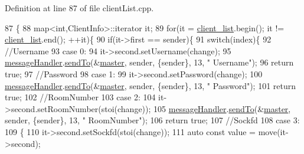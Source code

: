 Definition at line 87 of file client\+List.\+cpp.


\begin{DoxyCode}
87                                                                  \{
88     map<int,ClientInfo>::iterator it;
89     \textcolor{keywordflow}{for}(it = \hyperlink{class_client_list_a53c73362bff032aa6fceab4b8b5b39de}{client\_list}.begin(); it != \hyperlink{class_client_list_a53c73362bff032aa6fceab4b8b5b39de}{client\_list}.end(); ++it)\{
90         \textcolor{keywordflow}{if}(it->first == sender)\{
91             \textcolor{keywordflow}{switch}(index)\{
92                 \textcolor{comment}{//Username}
93                 \textcolor{keywordflow}{case} 0:
94                     it->second.setUsername(change);
95                     \hyperlink{class_client_list_a15fd10297f79e0d1278d3b106c715390}{messageHandler}.\hyperlink{class_message_handler_a81dd916f61ef7f19d10cd3adee55bda9}{sendTo}(&\hyperlink{class_client_list_a819f5455b1afa484d846d5b6ef4209a7}{master}, sender, \{sender\}, 13, \textcolor{stringliteral}{"
      Username"});
96                     \textcolor{keywordflow}{return} \textcolor{keyword}{true};
97                 \textcolor{comment}{//Password}
98                 \textcolor{keywordflow}{case} 1:
99                     it->second.setPassword(change);
100                     \hyperlink{class_client_list_a15fd10297f79e0d1278d3b106c715390}{messageHandler}.\hyperlink{class_message_handler_a81dd916f61ef7f19d10cd3adee55bda9}{sendTo}(&\hyperlink{class_client_list_a819f5455b1afa484d846d5b6ef4209a7}{master}, sender, \{sender\}, 13, \textcolor{stringliteral}{"
      Password"});
101                     \textcolor{keywordflow}{return} \textcolor{keyword}{true};
102                 \textcolor{comment}{//RoomNumber}
103                 \textcolor{keywordflow}{case} 2:
104                     it->second.setRoomNumber(stoi(change));
105                     \hyperlink{class_client_list_a15fd10297f79e0d1278d3b106c715390}{messageHandler}.\hyperlink{class_message_handler_a81dd916f61ef7f19d10cd3adee55bda9}{sendTo}(&\hyperlink{class_client_list_a819f5455b1afa484d846d5b6ef4209a7}{master}, sender, \{sender\}, 13, \textcolor{stringliteral}{"
      RoomNumber"});
106                     \textcolor{keywordflow}{return} \textcolor{keyword}{true};
107                 \textcolor{comment}{//Sockfd}
108                 \textcolor{keywordflow}{case} 3:
109                     \{
110                     it->second.setSockfd(stoi(change));
111                     \textcolor{keyword}{auto} \textcolor{keyword}{const} value = move(it->second);

\end{DoxyCode}
